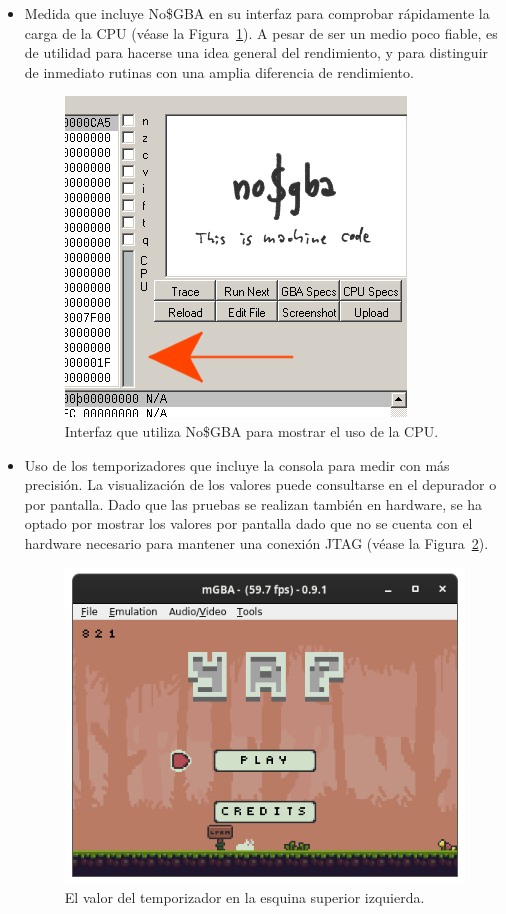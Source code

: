 \begin{itemize}
	\item Medida que incluye No\$GBA en su interfaz para comprobar rápidamente la carga de la CPU (véase la Figura~\ref{fig:nogba_bench}). A pesar de ser un medio poco fiable, es de utilidad para hacerse una idea general del rendimiento, y para distinguir de inmediato rutinas con una amplia diferencia de rendimiento.

		\begin{figure}[h]
			\centering
			\includegraphics[width=.5\textwidth]{capitulos/capitulo5/nogba_bench.png}
			\caption{Interfaz que utiliza No\$GBA para mostrar el uso de la CPU.}\label{fig:nogba_bench}
		\end{figure}
		\FloatBarrier{}

	\item Uso de los temporizadores que incluye la consola para medir con más precisión. La visualización de los valores puede consultarse en el depurador o por pantalla. Dado que las pruebas se realizan también en hardware, se ha optado por mostrar los valores por pantalla dado que no se cuenta con el hardware necesario para mantener una conexión JTAG (véase la Figura~\ref{fig:bench_value}).

		\begin{figure}[h]
			\centering
			\includegraphics[width=.6\textwidth]{capitulos/capitulo5/bench_value.png}
			\caption{El valor del temporizador en la esquina superior izquierda.}\label{fig:bench_value}
		\end{figure}
		\FloatBarrier{}


\end{itemize}
